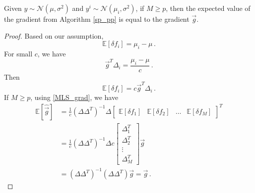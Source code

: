 \begin{lemma} \label{lem_expVal}
Given $y \sim \mathcal{N}(\mu,\sigma^2)$ and $y^i \sim \mathcal{N}(\mu_i,\sigma^2)$, if $M\geq p$, then the expected value of the gradient from Algorithm \ref{sp_pp} is equal to the gradient $\vec{g}$.
\end{lemma}

\begin{proof}

Based on our assumption, 
$$ \mathbb{E} \left[ \delta f_i \right] = \mu_i - \mu \,.$$
For small $c$, we have
$$ \vec{g}^T \Delta_i = \frac{\mu_i - \mu}{c}\,. $$
Then
$$ \mathbb{E} \left[ \delta f_i \right] =c \vec{g}^T \Delta_i \,.$$
If $M\geq p$, using \eqref{MLS_grad}, we have
\begin{equation} \label{lem_eq2} 
\begin{aligned} 
\mathbb{E} [\hat{\vec{g}}] &= \frac{1}{c} \left(\Delta \Delta^T \right)^{-1} \Delta \begin{bmatrix}  \mathbb{E} \left[ \delta f_1\right] &  \mathbb{E} \left[ \delta f_2 \right]& \hdots &  \mathbb{E} \left[ \delta f_M\right]\end{bmatrix}^T \\
&= \frac{1}{c} \left(\Delta \Delta^T \right)^{-1} \Delta c \begin{bmatrix}  \Delta_1^T \\  \Delta_2^T \\ \vdots \\  \Delta_M^T \end{bmatrix} \vec{g} \\
&=  \left(\Delta \Delta^T \right)^{-1}  \left(\Delta \Delta^T \right) \vec{g} = \vec{g}\,.
\end{aligned}
\end{equation}
\end{proof}


